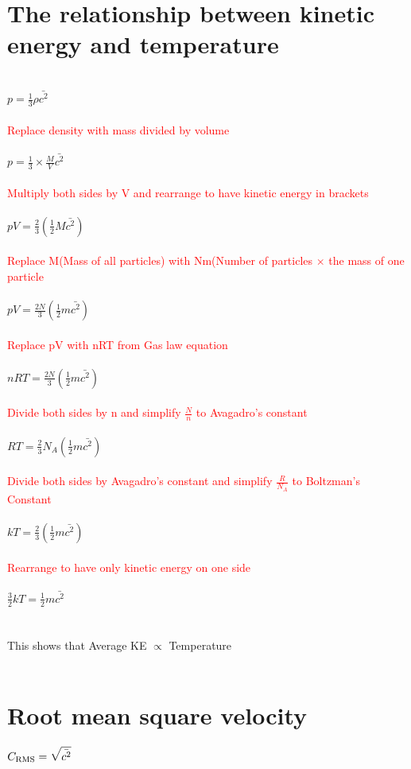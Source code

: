 \documentclass{article}[18pt]
\begin{document}
\section{The relationship between kinetic energy and temperature}
$ $\\
$p=\frac{1}{3}\rho\bar{c^2}$\\
\\
\textcolor{red}{Replace density with mass divided by volume}\\
\\
$p=\frac{1}{3}\times\frac{M}{V}\bar{c^2}$\\
\\
\textcolor{red}{Multiply both sides by V and rearrange to have kinetic energy in brackets}\\
\\
$pV=\frac{2}{3}(\frac{1}{2}M\bar{c^2})$\\
\\
\textcolor{red}{Replace M(Mass of all particles) with Nm(Number of particles $\times$ the mass of one particle}\\
\\
$pV=\frac{2N}{3}(\frac{1}{2}m\bar{c^2})$\\
\\
\textcolor{red}{Replace pV with nRT from Gas law equation}\\
\\
$nRT=\frac{2N}{3}(\frac{1}{2}m\bar{c^2})$\\
\\
\textcolor{red}{Divide both sides by n and simplify $\frac{N}{n}$ to Avagadro's constant}\\
\\
$RT=\frac{2}{3}N_A(\frac{1}{2}m\bar{c^2})$\\
\\
\textcolor{red}{Divide both sides by Avagadro's constant and simplify $\frac{R}{N_A}$ to Boltzman's Constant}\\
\\
$kT=\frac{2}{3}(\frac{1}{2}m\bar{c^2})$\\
\\
\textcolor{red}{Rearrange to have only kinetic energy on one side}\\
\\
$\frac{3}{2}kT=\frac{1}{2}m\bar{c^2}$\\
\\
\\
This shows that Average KE $\propto$ Temperature\\
\\
\section{Root mean square velocity}
$C_\text{RMS}=\mathlarger{\sqrt{\bar{c^2}}}$
\end{document}
